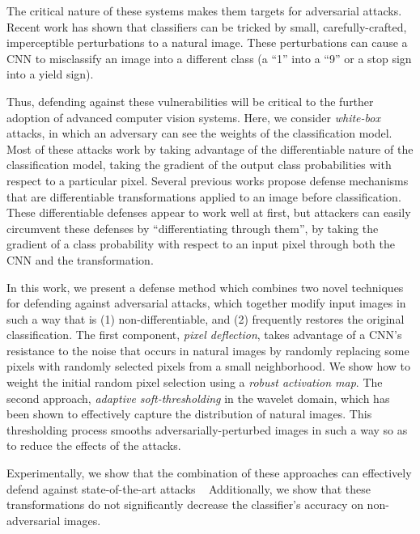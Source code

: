 The critical nature of these systems makes them targets for adversarial attacks.
Recent work has shown that classifiers can be tricked by small, carefully-crafted, imperceptible perturbations to a natural image.
These perturbations can cause a CNN to misclassify an image into a different class (\eg a ``1'' into a ``9'' or a stop sign into a yield sign). 

Thus, defending against these vulnerabilities will be critical to the further adoption of advanced computer vision systems.
Here, we consider \emph{white-box} attacks, in which an adversary can see the weights of the classification model.
Most of these attacks work by taking advantage of the differentiable nature of the classification model, \ie taking the gradient of the output class probabilities with respect to a particular pixel. 
Several previous works propose defense mechanisms that are differentiable transformations applied to an image before classification.
These differentiable defenses appear to work well at first, but attackers can easily circumvent these defenses by ``differentiating through them'', \ie by taking the gradient of a class probability with respect to an input pixel through both the CNN and the transformation. 

In this work, we present a defense method which combines two novel techniques for defending against adversarial attacks, which together modify input images in such a way that is (1) non-differentiable, and (2) frequently restores the original classification.
The first component, \emph{pixel deflection}, takes advantage of a CNN's resistance to the noise that occurs in natural images by randomly replacing some pixels with randomly selected pixels from a small neighborhood.
We show how to weight the initial random pixel selection using a \emph{robust activation map}.
The second approach, \emph{adaptive soft-thresholding} in the wavelet domain, which has been shown to effectively capture the distribution of natural images.
This thresholding process smooths adversarially-perturbed images in such a way so as to reduce the effects of the attacks.

Experimentally, we show that the combination of these approaches can effectively defend against state-of-the-art attacks ~\cite{Szegedy2013IntriguingPO, Goodfellow2014ExplainingAH,Carlini2017TowardsET,MoosaviDezfooli2016DeepFoolAS,papernot2016limitations,Kurakin2016AdversarialEI}
Additionally, we show that these transformations do not significantly decrease the classifier's accuracy on non-adversarial images.

